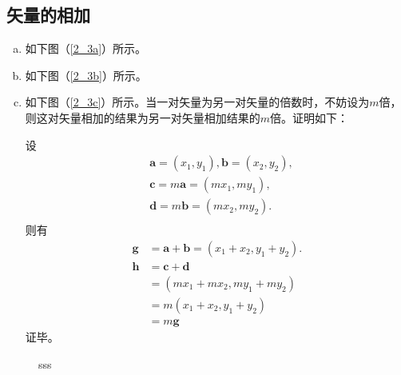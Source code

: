 \subsection{矢量的相加}
\begin{enumerate}[(a)]
	\item 如下图（\ref{2_3a}）所示。
	\item 如下图（\ref{2_3b}）所示。
	\item 如下图（\ref{2_3c}）所示。当一对矢量为另一对矢量的倍数时，不妨设为$ m $倍，则这对矢量相加的结果为另一对矢量相加结果的$ m $倍。证明如下：

设
	\[
	\begin{aligned}
	&\bm{a} = (x_1,y_1), \bm{b} = (x_2,y_2), \\
	&\bm{c} = m\bm{a} = (mx_1,my_1), \\
	&\bm{d} = m\bm{b} = (m x_2,m y_2).\\
	\end{aligned}
	 \]
则有
	\[
	\begin{aligned}
	\bm{g} &= \bm{a} + \bm{b} = (x_1 + x_2, y_1+y_2).\\
	\bm{h} &= \bm{c} + \bm{d} \\
			&= (mx_1 + mx_2, my_1 + my_2) \\
			&=m(x_1+x_2, y_1+y_2) \\
			&=m\bm{g}
	\end{aligned}
	\]
证毕。
\end{enumerate}

\begin{figure}[htbp]
	\centering
	sss
	\\	
	\caption{}
	\label{2_3}
\end{figure}
